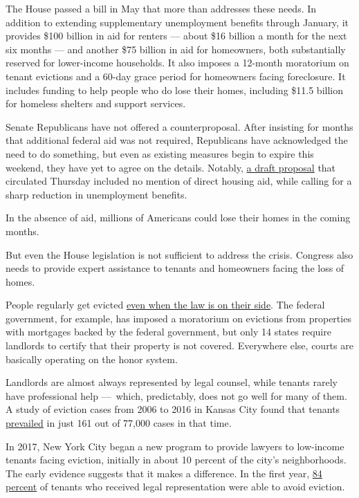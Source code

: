 The House passed a bill in May that more than addresses these needs. In
addition to extending supplementary unemployment benefits through
January, it provides \$100 billion in aid for renters --- about \$16
billion a month for the next six months --- and another \$75 billion in
aid for homeowners, both substantially reserved for lower-income
households. It also imposes a 12-month moratorium on tenant evictions
and a 60-day grace period for homeowners facing foreclosure. It includes
funding to help people who do lose their homes, including \$11.5 billion
for homeless shelters and support services.

Senate Republicans have not offered a counterproposal. After insisting
for months that additional federal aid was not required, Republicans
have acknowledged the need to do something, but even as existing
measures begin to expire this weekend, they have yet to agree on the
details. Notably,
\href{https://www.nytimes.com/interactive/2020/07/23/us/republican-draft-virus-aid-bill-july-23.html}{a
draft proposal} that circulated Thursday included no mention of direct
housing aid, while calling for a sharp reduction in unemployment
benefits.

In the absence of aid, millions of Americans could lose their homes in
the coming months.

But even the House legislation is not sufficient to address the crisis.
Congress also needs to provide expert assistance to tenants and
homeowners facing the loss of homes.

People regularly get evicted
\href{https://www.nytimes.com/2020/07/23/business/evictions-moratorium-cares-act.html}{even
when the law is on their side}. The federal government, for example, has
imposed a moratorium on evictions from properties with mortgages backed
by the federal government, but only 14 states require landlords to
certify that their property is not covered. Everywhere else, courts are
basically operating on the honor system.

Landlords are almost always represented by legal counsel, while tenants
rarely have professional help ---~which, predictably, does not go well
for many of them. A study of eviction cases from 2006 to 2016 in Kansas
City found that tenants
\href{https://static1.squarespace.com/static/59ba0bd359cc68f015b7ff8a/t/5a68e811e4966bee3fb5d6cd/1516824594549/KC+Eviction+Project+-+Courts+Analysis.pdf}{prevailed}
in just 161 out of 77,000 cases in that time.

In 2017, New York City began a new program to provide lawyers to
low-income tenants facing eviction, initially in about 10 percent of the
city's neighborhoods. The early evidence suggests that it makes a
difference. In the first year,
\href{https://www.cssny.org/news/entry/nyc-right-to-counsel}{84 percent}
of tenants who received legal representation were able to avoid
eviction.

